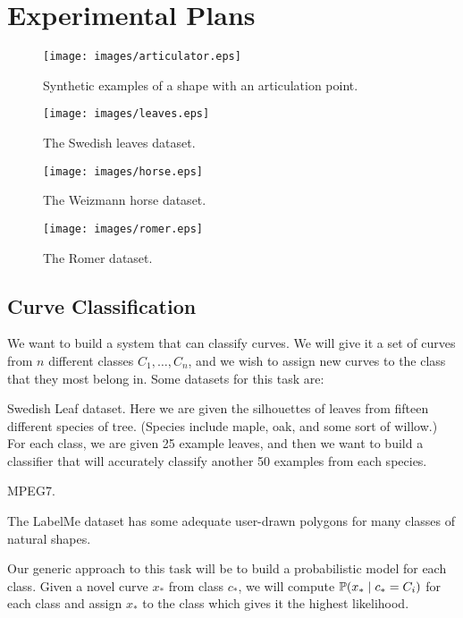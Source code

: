 \documentclass{article}
\begin{document}
\section{Experimental Plans}

\begin{figure}
  \centering
\texttt{[image: images/articulator.eps]}
\caption{Synthetic examples of a shape with an articulation point.}
\label{fig-articulator}
\end{figure}

\begin{figure}
  \centering
\texttt{[image: images/leaves.eps]}
\caption{The Swedish leaves dataset.}
\label{fig-leaves}
\end{figure}

\begin{figure}
  \centering
\texttt{[image: images/horse.eps]}
\caption{The Weizmann horse dataset.}
\label{fig-horse}
\end{figure}

\begin{figure}
  \centering
\texttt{[image: images/romer.eps]}
\caption{The Romer dataset.}
\label{fig-romer}
\end{figure}


\subsection{Curve Classification}

We want to build a system that can classify curves. We will give it a
set of curves from $n$ different classes $C_1,\dots,C_n$, and we wish
to assign new curves to the class that they most belong in. Some
datasets for this task are:
\bitem
\item Swedish Leaf dataset. Here we are given the silhouettes of
  leaves from fifteen different species of tree. (Species include
  maple, oak, and some sort of willow.) For each class, we are given
  25 example leaves, and then we want to build a classifier that will
  accurately classify another 50 examples from each species.

\item MPEG7.

\item The LabelMe dataset \cite{labelme} has some adequate user-drawn
  polygons for many classes of natural shapes.

\eitem

Our generic approach to this task will be to build a probabilistic
model for each class. Given a novel curve $x_*$ from class $c_*$, we
will compute $\mathbb{P}( x_* \mid c_* = C_i)$ for each class and assign
$x_*$ to the class which gives it the highest likelihood.
\end{document}
